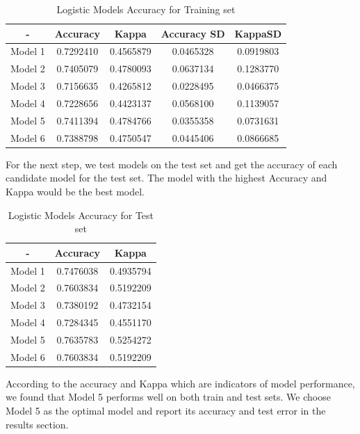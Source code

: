 \documentclass{article}
\begin{document}
\begin{table}[H]
    \centering
    \begin{tabular}{c|c|c|c|c}
    \hline
         -& Accuracy& Kappa& Accuracy SD & KappaSD \\
         \hline
         \hline
        Model 1& 0.7292410&	0.4565879& 0.0465328& 0.0919803\\
          Model 2& 0.7405079&	0.4780093& 0.0637134& 0.1283770\\
          Model 3& 0.7156635&	0.4265812& 0.0228495& 0.0466375\\
          Model 4& 0.7228656&	0.4423137& 0.0568100& 0.1139057\\
          Model 5& 0.7411394&	0.4784766& 0.0355358& 0.0731631\\
          Model 6& 0.7388798&
         0.4750547&
         0.0445406& 0.0866685\\
        \hline 
    \end{tabular}
    \caption{Logistic Models Accuracy for Training set}
    \label{Accuracy of logistic models}
\end{table}
For the next step, we test models on the test set and get the accuracy of each candidate model for the test set. The model with the highest Accuracy and Kappa would be the best model.\\
\begin{table}[H]
    \centering
    \begin{tabular}{c|c|c}
    \hline
        - &Accuracy&
        Kappa\\
        \hline
        \hline
        Model 1 & 0.7476038& 0.4935794\\
        Model 2 &
        0.7603834 &0.5192209\\
        Model 3 &
        0.7380192& 0.4732154\\
        Model 4 &
        0.7284345& 0.4551170\\
        Model 5 &
        0.7635783& 0.5254272\\
        Model 6 &
        0.7603834& 0.5192209\\
        \hline
    \end{tabular}
    \caption{Logistic Models Accuracy for Test set}
    \label{Accuracy of models for test set}
\end{table}
According to the accuracy and Kappa which are indicators of model performance, we found that Model 5 performs well on both train and test sets. We choose Model 5 as the optimal model and report its accuracy and test error in the results section.
\end{document}
